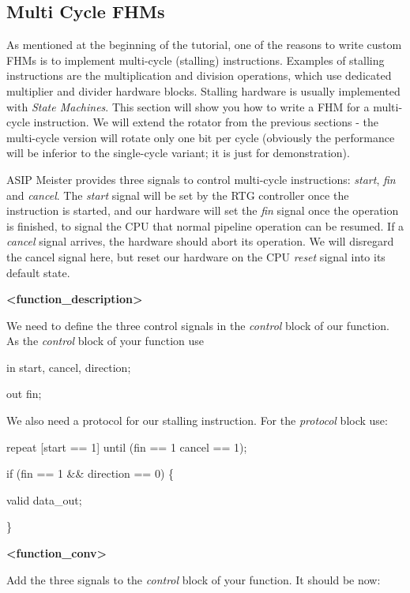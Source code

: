 \documentclass[
]{article}
\begin{document}
\hypertarget{multi-cycle-fhms}{%
\subsection{Multi Cycle FHMs}\label{multi-cycle-fhms}}

As mentioned at the beginning of the tutorial, one of the reasons to
write custom FHMs is to implement multi-cycle (stalling) instructions.
Examples of stalling instructions are the multiplication and division
operations, which use dedicated multiplier and divider hardware blocks.
Stalling hardware is usually implemented with \emph{State Machines}.
This section will show you how to write a FHM for a multi-cycle
instruction. We will extend the rotator from the previous sections - the
multi-cycle version will rotate only one bit per cycle (obviously the
performance will be inferior to the single-cycle variant; it is just for
demonstration).

ASIP Meister provides three signals to control multi-cycle instructions:
\emph{start}, \emph{fin} and \emph{cancel}. The \emph{start} signal will
be set by the RTG controller once the instruction is started, and our
hardware will set the \emph{fin} signal once the operation is finished,
to signal the CPU that normal pipeline operation can be resumed. If a
\emph{cancel} signal arrives, the hardware should abort its operation.
We will disregard the cancel signal here, but reset our hardware on the
CPU \emph{reset} signal into its default state.

\textbf{\textless function\_description\textgreater{}}

We need to define the three control signals in the \emph{control} block
of our function. As the \emph{control} block of your function use

in start, cancel, direction;

out fin;

We also need a protocol for our stalling instruction. For the
\emph{protocol} block use:

repeat {[}start == 1{]} until (fin == 1 \textbar\textbar{} cancel == 1);

if (fin == 1 \&\& direction == 0) \{

valid data\_out;

\}

\textbf{\textless function\_conv\textgreater{}}

Add the three signals to the \emph{control} block of your function. It
should be now:
\end{document}
